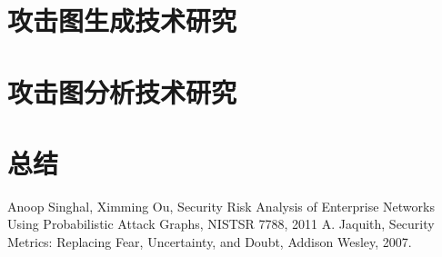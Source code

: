\documentclass[12pt,a4paper]{article}
\begin{document}
\section{攻击图生成技术研究}


\section{攻击图分析技术研究}

\section{总结}

\renewcommand{\refname}{\centerline{参考文献}}
\begin{thebibliography}{}
 Anoop Singhal, Ximming Ou, Security Risk Analysis of Enterprise Networks Using Probabilistic Attack Graphs, NISTSR 7788, 2011
 A. Jaquith, Security Metrics: Replacing Fear, Uncertainty, and Doubt, Addison Wesley, 2007.
\end{thebibliography}
\end{document}
